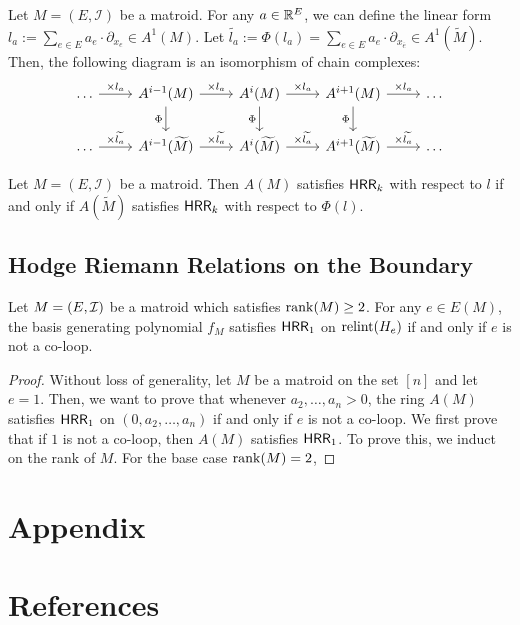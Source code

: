 \documentclass{puthesis-UG}
\begin{document}
\begin{cor}
	Let $M = (E, \mathcal{I})$ be a matroid. For any $a \in \mathbb{R}^E$, we can define the linear form $l_a := \sum_{e \in E} a_e \cdot \partial_{x_e} \in A^1(M)$. Let $\widetilde{l_a} := \Phi(l_a) = \sum_{e \in E} a_e \cdot \partial_{x_{\overline{e}}} \in A^1(\widetilde{M})$. Then, the following diagram is an isomorphism of chain complexes:
	\[\begin{tikzcd}
	\ldots & {A^{i-1}(M)} & {A^i(M)} & {A^{i+1}(M)} & \ldots \\
	\ldots & {A^{i-1}(\widetilde{M})} & {A^i(\widetilde{M})} & {A^{i+1}(\widetilde{M})} & \ldots
	\arrow["{\times l_a}", from=1-1, to=1-2]
	\arrow["{\times \widetilde{l_a}}", from=2-1, to=2-2]
	\arrow["\Phi"', from=1-2, to=2-2]
	\arrow["{\times l_a}", from=1-2, to=1-3]
	\arrow["{\times \widetilde{l_a}}", from=2-2, to=2-3]
	\arrow["{\times l_a}", from=1-3, to=1-4]
	\arrow["{\times \widetilde{l_a}}", from=2-3, to=2-4]
	\arrow["\Phi"', from=1-3, to=2-3]
	\arrow["\Phi"', from=1-4, to=2-4]
	\arrow["{\times l_a}", from=1-4, to=1-5]
	\arrow["{\times \widetilde{l_a}}", from=2-4, to=2-5]
\end{tikzcd}\]

\begin{cor}
	Let $M = (E, \mathcal{I})$ be a matroid. Then $A(M)$ satisfies $\mathsf{HRR}_k$ with respect to $l$ if and only if $A(\widetilde{M})$ satisfies $\mathsf{HRR}_k$ with respect to $\Phi(l)$. 
\end{cor}
\end{cor}

\section{Hodge Riemann Relations on the Boundary}
\begin{thm}
	Let $M = (E, \mathcal{I})$ be a matroid which satisfies $\operatorname{rank} (M) \geq 2$. For any $e \in E(M)$, the basis generating polynomial $f_M$ satisfies $\mathsf{HRR}_1$ on $\operatorname{relint} (H_e)$ if and only if $e$ is not a co-loop.
\end{thm}

\begin{proof}
	Without loss of generality, let $M$ be a matroid on the set $[n]$ and let $e = 1$. Then, we want to prove that whenever $a_2, \ldots, a_n > 0$, the ring $A(M)$ satisfies $\mathsf{HRR}_1$ on $(0, a_2, \ldots, a_n)$ if and only if $e$ is not a co-loop. We first prove that if $1$ is not a co-loop, then $A(M)$ satisfies $\mathsf{HRR}_1$. To prove this, we induct on the rank of $M$. For the base case $\operatorname{rank} (M) = 2$, 
\end{proof}
\chapter{Appendix}

\chapter{References}
\end{document}
